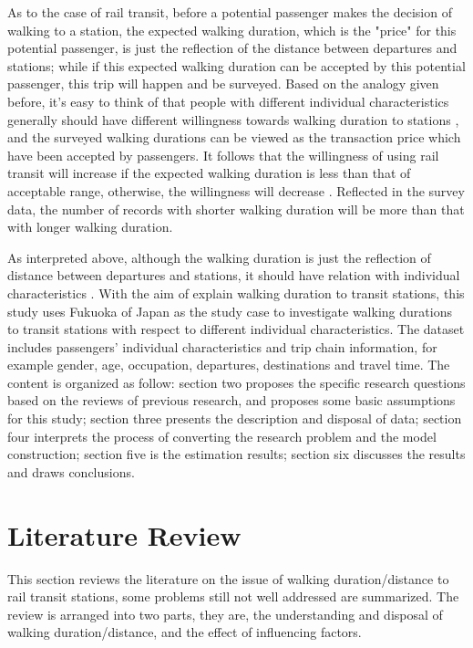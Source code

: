 \documentclass[sustainability,article,submit,moreauthors,pdftex,10pt,a4paper]{Definitions/mdpi}
\begin{document}
%
As to the case of rail transit, before a potential passenger makes the decision of walking to a station, the expected walking duration, which is the "price" for this potential passenger, is just the reflection of the distance between departures and stations; while if this expected walking duration can be accepted by this potential passenger, this trip will happen and be surveyed. Based on the analogy given before, it's easy to think of that people with different individual characteristics generally should have different willingness towards walking duration to stations \cite{frank1994impacts}, and the surveyed walking durations can be viewed as the transaction price which have been accepted by passengers. It follows that the willingness of using rail transit will increase if the expected walking duration is less than that of acceptable range, otherwise, the willingness will decrease \cite{waterson2003simulating}. Reflected in the survey data, the number of records with shorter walking duration will be more than that with longer walking duration. 

%
As interpreted above, although the walking duration is just the reflection of distance between departures and stations, it should have relation with individual characteristics \cite{besser2005walking,daniels2013explaining,guerra2012half,larsen2010beyond,yang2012walking,krygsman2004multimodal}. With the aim of explain walking duration to transit stations, this study uses Fukuoka of Japan as the study case to investigate walking durations to transit stations with respect to different individual characteristics. The dataset includes passengers' individual characteristics and trip chain information, for example gender, age, occupation, departures, destinations and travel time. The content is organized as follow: section two proposes the specific research questions based on the reviews of previous research, and proposes some basic assumptions for this study; section three presents the description and disposal of data; section four interprets the process of converting the research problem and the model construction; section five is the estimation results; section six discusses the results and draws conclusions. 
 
\section{Literature Review}
%
This section reviews the literature on the issue of walking duration/distance to rail transit stations, some problems still not well addressed are summarized. The review is arranged into two parts, they are, the understanding and disposal of walking duration/distance, and the effect of influencing factors.
\end{document}
